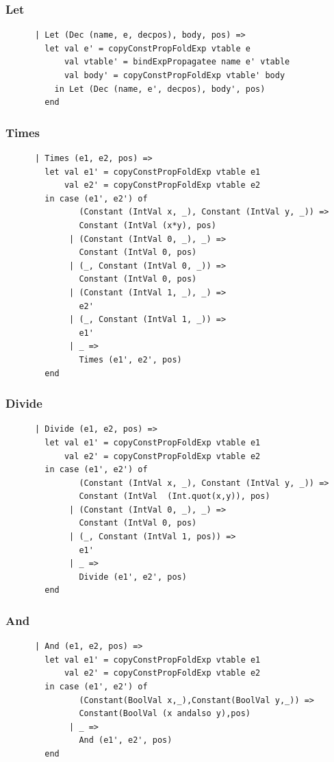\documentclass[11pt]{article}
\begin{document}
    \subsubsection{Let} \label{ccpflet}
    \begin{lstlisting}
      | Let (Dec (name, e, decpos), body, pos) =>
        let val e' = copyConstPropFoldExp vtable e
            val vtable' = bindExpPropagatee name e' vtable
            val body' = copyConstPropFoldExp vtable' body
          in Let (Dec (name, e', decpos), body', pos)
        end
    \end{lstlisting}

    \subsubsection{Times} \label{ccpftimes}
    \begin{lstlisting}
      | Times (e1, e2, pos) =>
        let val e1' = copyConstPropFoldExp vtable e1
            val e2' = copyConstPropFoldExp vtable e2
        in case (e1', e2') of
               (Constant (IntVal x, _), Constant (IntVal y, _)) =>
               Constant (IntVal (x*y), pos)
             | (Constant (IntVal 0, _), _) =>
               Constant (IntVal 0, pos)
             | (_, Constant (IntVal 0, _)) =>
               Constant (IntVal 0, pos)
             | (Constant (IntVal 1, _), _) =>
               e2'
             | (_, Constant (IntVal 1, _)) =>
               e1'
             | _ =>
               Times (e1', e2', pos)
        end
    \end{lstlisting}

    \subsubsection{Divide} \label{ccpfdiv}
    \begin{lstlisting}
      | Divide (e1, e2, pos) =>
        let val e1' = copyConstPropFoldExp vtable e1
            val e2' = copyConstPropFoldExp vtable e2
        in case (e1', e2') of
               (Constant (IntVal x, _), Constant (IntVal y, _)) =>
               Constant (IntVal  (Int.quot(x,y)), pos)
             | (Constant (IntVal 0, _), _) =>
               Constant (IntVal 0, pos)
             | (_, Constant (IntVal 1, pos)) =>
               e1'
             | _ =>
               Divide (e1', e2', pos)
        end
    \end{lstlisting}

    \subsubsection{And} \label{ccpfand}
    \begin{lstlisting}
      | And (e1, e2, pos) =>
        let val e1' = copyConstPropFoldExp vtable e1
            val e2' = copyConstPropFoldExp vtable e2
        in case (e1', e2') of
               (Constant(BoolVal x,_),Constant(BoolVal y,_)) =>
               Constant(BoolVal (x andalso y),pos)
             | _ =>
               And (e1', e2', pos)
        end
    \end{lstlisting}
\end{document}
